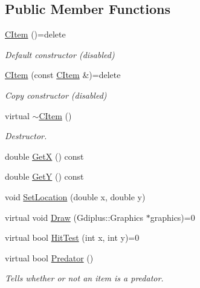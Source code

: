 \subsection*{Public Member Functions}
\begin{DoxyCompactItemize}
\item 
\mbox{\label{class_c_item_ac2ea847c008cf8d1de92c870c8f8262f}} 
\hyperlink{class_c_item_ac2ea847c008cf8d1de92c870c8f8262f}{C\+Item} ()=delete
\begin{DoxyCompactList}\small\item\em Default constructor (disabled) \end{DoxyCompactList}\item 
\mbox{\label{class_c_item_a7d6042bbb9a571d2dc1d1f89016a97c8}} 
\hyperlink{class_c_item_a7d6042bbb9a571d2dc1d1f89016a97c8}{C\+Item} (const \hyperlink{class_c_item}{C\+Item} \&)=delete
\begin{DoxyCompactList}\small\item\em Copy constructor (disabled) \end{DoxyCompactList}\item 
virtual \hyperlink{class_c_item_a2487c6e822ed0e850544f1745b43f584}{$\sim$\+C\+Item} ()
\begin{DoxyCompactList}\small\item\em Destructor. \end{DoxyCompactList}\item 
double \hyperlink{class_c_item_a394d38a058fc53f0e958ca52248560c8}{GetX} () const
\item 
double \hyperlink{class_c_item_ac0fe6be80f8ef19854d7f41b4803f658}{GetY} () const
\item 
void \hyperlink{class_c_item_a9c194f3f08e515853600cecca3e6d319}{Set\+Location} (double x, double y)
\item 
virtual void \hyperlink{class_c_item_a7ef8448d0c4bc53d0f1943a4dc817f6f}{Draw} (Gdiplus\+::\+Graphics $\ast$graphics)=0
\item 
virtual bool \hyperlink{class_c_item_a8bd4f5e3f2eb2487125dd435719484e8}{Hit\+Test} (int x, int y)=0
\item 
virtual bool \hyperlink{class_c_item_af4f25e99aaf4b27ed6bdc5ff70b75c11}{Predator} ()
\begin{DoxyCompactList}\small\item\em Tells whether or not an item is a predator. \end{DoxyCompactList}\end{DoxyCompactItemize}
